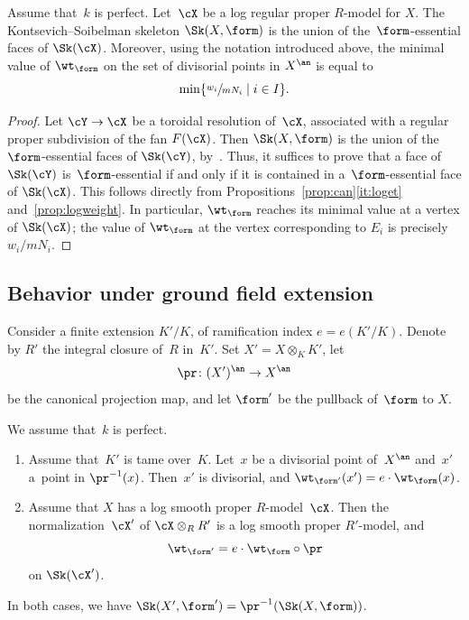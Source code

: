 \begin{prop}\label{prop:sklogmodel}
Assume that~$k$ is perfect. Let~$\cX$ be a log regular proper $R$\nobreakdash-model for $X$.
The Kontsevich--Soibelman skeleton $\Sk(X,\form)$ is the union of the~$\form$-essential faces of $\Sk(\cX)$.
Moreover, using the notation introduced above, the minimal value of $\wt_{\form}$ on the set of divisorial points in $X^{\an}$ is equal to
\[
\min\{\sfrac{w_i}{mN_i}\mid i\in I\}.
\]
\end{prop}

\begin{proof}
Let $\cY\to \cX$ be a toroidal resolution of~$\cX$, associated with a regular proper subdivision of the fan $F(\cX)$.
Then $\Sk(X,\form)$ is the union of the~$\form$-essential faces of $\Sk(\cY)$, by~\cite[4.7.5]{MuNi}.
Thus, it suffices to prove that a face of $\Sk(\cY)$ is~$\form$-essential if and only if it is contained in a~$\form$-essential face of $\Sk(\cX)$.
This follows directly from Propositions~\ref{prop:can}\eqref{it:loget} and~\ref{prop:logweight}. In particular, $\wt_{\form}$ reaches its minimal value at a vertex of $\Sk(\cX)$; the value of $\wt_{\form}$ at the vertex corresponding to $E_i$ is precisely $w_i/mN_i$.
\end{proof}

\subsection{Behavior under ground field extension}
Consider a finite extension $K'/K$, of ramification index $e=e(K'/K)$. Denote by $R'$ the integral closure of~$R$ in~$K'$. Set $X'=X\otimes_KK'$, let
\begin{equation*}
\pr\colon (X')^{\an}\to X^{\an}
\end{equation*}
be the canonical projection map, and let $\form'$ be the pullback of~$\form$ to $X$.
\begin{prop}\label{prop:skbasech}
We assume that~$k$ is perfect.
\begin{enumerate}
\item \label{it:skbasech-tame} Assume that~$K'$ is tame over~$K$. Let~$x$ be a divisorial point of~$X^{\an}$ and~$x'$ a~point in $\pr^{-1}(x)$. Then~$x'$ is divisorial, and
$\wt_{\form'}(x')=e\cdot \wt_{\form}(x)$.
\item \label{it:skbasech-logsm} Assume that $X$ has a log smooth proper $R$\nobreakdash-model~$\cX$. Then the normalization~$\cX'$ of $\cX\otimes_R R'$ is a log smooth proper $R'$-model, and
\[
\wt_{\form'}=e\cdot \wt_{\form}\circ \pr
\]
on $\Sk(\cX')$.
\end{enumerate}
In both cases, we have $\Sk(X',\form')=\pr^{-1}(\Sk(X,\form))$.
\end{prop}

